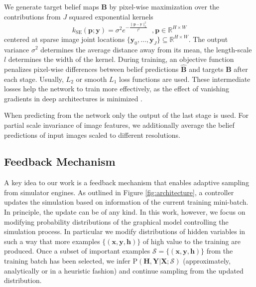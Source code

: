 \documentclass[conference]{IEEEtran}
\begin{document}
    We generate target belief maps $\mathbf{B}$ by pixel-wise maximization over the contributions from $J$ squared exponential kernels
    \begin{equation}
        k_{\textrm{SE}}(\mathbf{p};\mathbf{y}) = \sigma^2e^{-\frac{\lVert \mathbf{p} - \mathbf{y} \rVert^2_2}{l^2}} \;\;,{\mathbf{p} \in \mathbb{R}^{H\times W}}
    \end{equation}
    centered at sparse image joint locations ${\{\mathbf{y}_0,\ldots,\mathbf{y}_J\} \subseteq \mathbb{R}^{H\times W}}$. The output variance $\sigma^2$ determines the average distance away from its mean, the length-scale $l$ determines the width of the kernel. During training, an objective function penalizes pixel-wise differences between belief predictions $\hat{\mathbf{B}}$ and targets $\mathbf{B}$ after each stage. Usually, $L_2$ or smooth $L_1$ loss functions are used. These intermediate losses help the network to train more effectively, as the effect of vanishing gradients in deep architectures is minimized \cite{newell2016stacked, wei2016convolutional}. 
    
    When predicting from the network only the output of the last stage is used. For partial scale invariance of image features, we additionally average the belief predictions of input images scaled to different resolutions.

\subsection{Feedback Mechanism}
    \label{sec:feedback}
    A key idea to our work is a feedback mechanism that enables adaptive sampling from simulator engines. As outlined in Figure \ref{fig:architecture}, a controller updates the simulation based on information of the current training mini-batch. In principle, the update can be of any kind. In this work, however, we focus on modifying probability distributions of the graphical model controlling the simulation process. In particular we modify distributions of hidden variables in such a way that more examples $\{(\textbf{x},\textbf{y},\textbf{h})\}$ of high value to the training are produced. Once a subset of important examples $\mathcal{S} = \{(\textbf{x},\textbf{y},\textbf{h})\}$ from the training batch has been selected, we infer $\mathrm{P}(\textbf{H},\textbf{Y} \lvert \textbf{X};\mathcal{S})$ (approximately, analytically or in a heuristic fashion) and continue sampling from the updated distribution.
\end{document}
